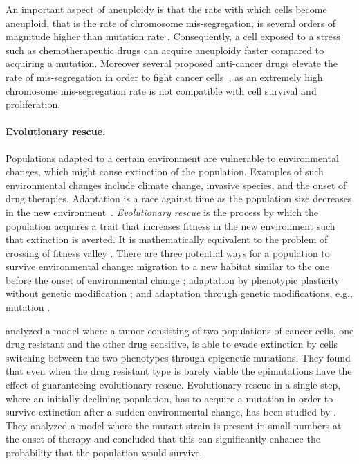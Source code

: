 \documentclass[12pt]{extarticle}
\begin{document}
An important aspect of aneuploidy is that the rate with which cells become aneuploid, that is the rate of chromosome mis-segregation, is several orders of magnitude higher than mutation rate \citep{bakker2023predicting}. Consequently, a cell exposed to a stress such as chemotherapeutic drugs can acquire aneuploidy faster compared to acquiring a mutation. Moreover several proposed anti-cancer drugs elevate the rate of mis-segregation in order to fight cancer cells~\citep{lee2016effects}, as an extremely high chromosome mis-segregation rate is not compatible with cell survival and proliferation.

\paragraph{Evolutionary rescue.} Populations adapted to a certain environment are vulnerable to environmental changes, which might cause extinction of the population. Examples of such environmental changes include climate change, invasive species, and the onset of drug therapies. Adaptation is a race against time as the population size decreases in the new environment~\citep{tanaka2022surviving}. 
\emph{Evolutionary rescue} is the process by which the population acquires a trait that increases fitness in the new environment such that extinction is averted. It is mathematically equivalent to the problem of crossing of fitness valley \citep{weissman2009rate,weissman2010rate}.
There are three potential ways for a population to survive environmental change: migration to a new habitat similar to the one before the onset of environmental change \citep{harsch2014keeping,cobbold2020should,zhou2022range}; adaptation by phenotypic plasticity without genetic modification \citep{carja2019evolutionary,carja2017evolutionary,levien2021non,gunnarsson2020understanding}; and adaptation through genetic modifications, e.g., mutation \citep{gomulkiewicz1995does,uecker2014evolutionary,uecker2016role,uecker2011fixation,orr2014population}.

\citet{gunnarsson2020understanding} analyzed a model where a tumor consisting of two populations of cancer cells, one drug resistant and the other drug sensitive, is able to evade extinction by cells switching between the two phenotypes through epigenetic mutations. They found that even when the drug resistant type is barely viable the epimutations have the effect of guaranteeing evolutionary rescue. Evolutionary rescue in a single step, where an initially declining population, has to acquire a mutation in order to survive extinction after a sudden environmental change, has been studied by \citet{orr2008population,orr2014population}. They analyzed a model where the mutant strain is present in small numbers at the onset of therapy and concluded that this can significantly enhance the probability that the population would survive. 
\end{document}
